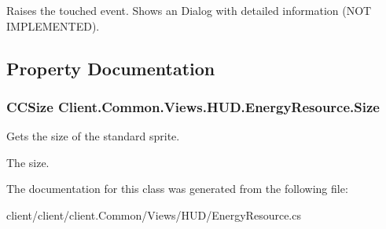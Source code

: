 Raises the touched event. Shows an Dialog with detailed information (N\+O\+T I\+M\+P\+L\+E\+M\+E\+N\+T\+E\+D). 



\subsection{Property Documentation}
\hypertarget{classClient_1_1Common_1_1Views_1_1HUD_1_1EnergyResource_a669110b5713d496e352229b5d7b251fa}{}
\subsubsection[{Size}]{\setlength{\rightskip}{0pt plus 5cm}C\+C\+Size Client.\+Common.\+Views.\+H\+U\+D.\+Energy\+Resource.\+Size\hspace{0.3cm}{\ttfamily [get]}}\label{classClient_1_1Common_1_1Views_1_1HUD_1_1EnergyResource_a669110b5713d496e352229b5d7b251fa}


Gets the size of the standard sprite. 

The size.

The documentation for this class was generated from the following file\+:\begin{DoxyCompactItemize}
\item 
client/client/client.\+Common/\+Views/\+H\+U\+D/Energy\+Resource.\+cs\end{DoxyCompactItemize}
